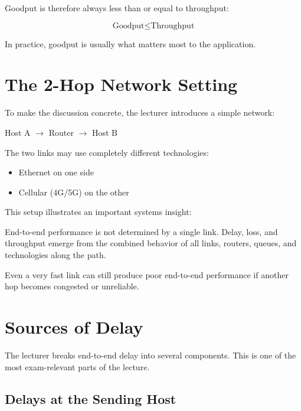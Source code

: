Goodput is therefore always less than or equal to throughput:

\[
\text{Goodput} \leq \text{Throughput}
\]

In practice, goodput is usually what matters most to the application.

\section{The 2-Hop Network Setting}

To make the discussion concrete, the lecturer introduces a simple network:

\begin{center}
Host A $\rightarrow$ Router $\rightarrow$ Host B
\end{center}

The two links may use completely different technologies:
\begin{itemize}[leftmargin=1.5em]
    \item Ethernet on one side
    \item Cellular (4G/5G) on the other
\end{itemize}

This setup illustrates an important systems insight:

\begin{mdframed}[backgroundcolor=lightgray, linewidth=0pt,
innertopmargin=8pt, innerbottommargin=8pt]
End-to-end performance is not determined by a single link. Delay, loss, and
throughput emerge from the combined behavior of all links, routers, queues, and
technologies along the path.
\end{mdframed}

Even a very fast link can still produce poor end-to-end performance if another
hop becomes congested or unreliable.

\section{Sources of Delay}

The lecturer breaks end-to-end delay into several components. This is one of
the most exam-relevant parts of the lecture.

\subsection{Delays at the Sending Host}

